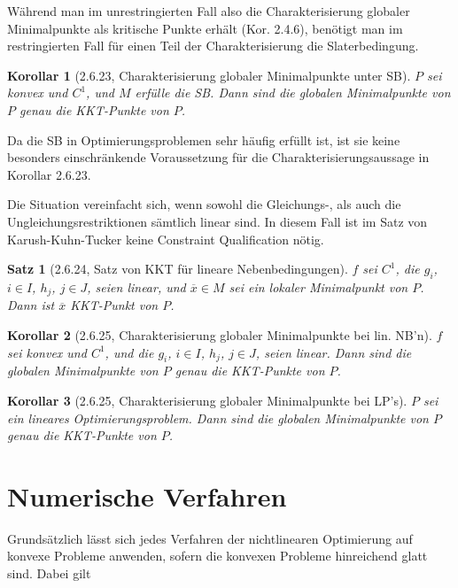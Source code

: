 \documentclass[12pt]{extreport} %
\theoremstyle{named}
\theoremstyle{nnamed}
\theoremstyle{itshape}
\newtheorem*{satz}{Satz}
\theoremstyle{normal}
\newtheorem*{korollar}{Korollar}
\begin{document}
Während man im unrestringierten Fall also die Charakterisierung globaler Minimalpunkte als kritische Punkte erhält (Kor. 2.4.6), benötigt man im restringierten Fall für einen Teil der Charakterisierung die Slaterbedingung.

\begin{korollar}[2.6.23, Charakterisierung globaler Minimalpunkte unter SB]	
	$P$ sei konvex und $C^1$, und $M$ erfülle die SB. Dann sind die globalen Minimalpunkte von $P$ genau die KKT-Punkte von $P$.	
\end{korollar}

Da die SB in Optimierungsproblemen sehr häufig erfüllt ist, ist sie keine besonders einschränkende Voraussetzung für die Charakterisierungsaussage in Korollar 2.6.23. ~\bigskip

Die Situation vereinfacht sich, wenn sowohl die Gleichungs-, als auch die Ungleichungsrestriktionen sämtlich linear sind. In diesem Fall ist im Satz von Karush-Kuhn-Tucker keine Constraint Qualification nötig.

\begin{satz}[2.6.24, Satz von KKT für lineare Nebenbedingungen]
	$f$ sei $C^1$, die $g_i$, $i \in I$, $h_j$, $j \in J$, seien linear, und $\overline{x} \in M$ sei ein lokaler Minimalpunkt von $P$. Dann ist $\overline{x}$ KKT-Punkt von $P$.	
\end{satz}

\begin{korollar}[2.6.25, Charakterisierung globaler Minimalpunkte bei lin. NB'n]
	$f$ sei konvex und $C^1$, und die $g_i$, $i \in I$, $h_j$, $j \in J$, seien linear. Dann sind die globalen Minimalpunkte von $P$ genau die KKT-Punkte von $P$.
\end{korollar}

\begin{korollar}[2.6.25, Charakterisierung globaler Minimalpunkte bei LP's]
	$P$ sei ein lineares Optimierungsproblem. Dann sind die globalen Minimalpunkte von $P$ genau die KKT-Punkte von $P$.
\end{korollar}	
	
\section{Numerische Verfahren}	

Grundsätzlich lässt sich jedes Verfahren der nichtlinearen Optimierung auf konvexe Probleme anwenden, sofern die konvexen Probleme hinreichend glatt sind. Dabei gilt
\end{document}
